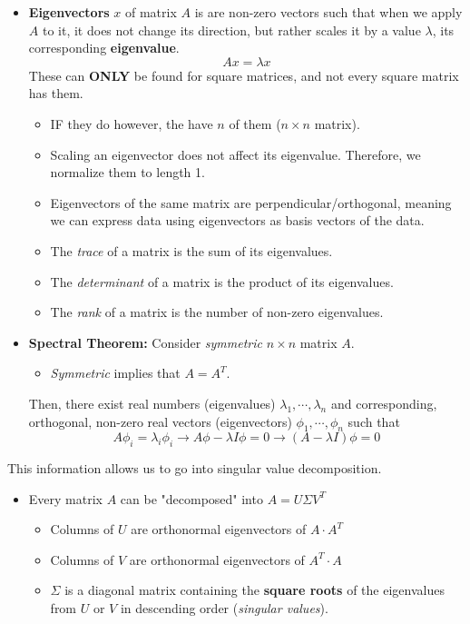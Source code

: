 \documentclass{article}
\begin{document}
\begin{itemize}
    \item \textbf{Eigenvectors} $x$ of matrix $A$ is are non-zero vectors such that when we apply $A$ to it, it does not change its direction, but rather scales it by a value $\lambda$, its corresponding \textbf{eigenvalue}.
    $$Ax = \lambda x$$
    These can \textbf{ONLY} be found for square matrices, and not every square matrix has them. 
    \begin{itemize}
        \item IF they do however, the have $n$ of them ($n\times n$ matrix).
        \item Scaling an eigenvector does not affect its eigenvalue. Therefore, we normalize them to length 1.
        \item Eigenvectors of the same matrix are perpendicular/orthogonal, meaning we can express data using eigenvectors as basis vectors of the data.
        \item The \textit{trace} of a matrix is the sum of its eigenvalues. 
        \item The \textit{determinant} of a matrix is the product of its eigenvalues. 
        \item The \textit{rank} of a matrix is the number of non-zero eigenvalues. 
    \end{itemize}
    \item \textbf{Spectral Theorem:} Consider \textit{symmetric} $n \times n$ matrix $A$. 
    \begin{itemize}
        \item \textit{Symmetric} implies that $A = A^T$.
    \end{itemize} Then, there exist real numbers (eigenvalues) $\lambda_1, \cdots, \lambda_n$ and corresponding, orthogonal, non-zero real vectors (eigenvectors) $\phi_1,\cdots,\phi_n$ such that
    $$A\phi_i = \lambda_i\phi_i\rightarrow A\phi - \lambda I\phi = 0 \rightarrow (A - \lambda I)\phi = 0$$
\end{itemize}
This information allows us to go into singular value decomposition.
\begin{itemize}
    \item Every matrix $A$ can be "decomposed" into $A = U\Sigma V^T$
    \begin{itemize}
        \item Columns of $U$ are orthonormal eigenvectors of $A\cdot A^T$
        \item Columns of $V$ are orthonormal eigenvectors of $A^T\cdot A$
        \item $\Sigma$ is a diagonal matrix containing the \textbf{square roots} of the eigenvalues from $U$ or $V$ in descending order (\textit{singular values}).
    \end{itemize}
\end{itemize}
\end{document}
